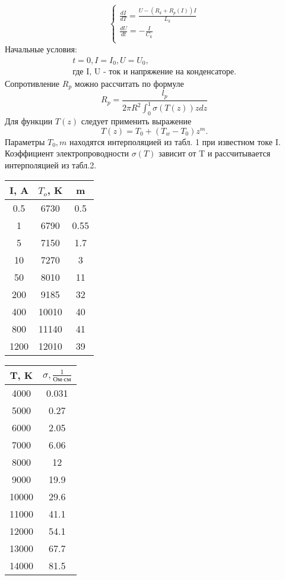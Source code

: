 \begin{equation}
\begin{cases}
\frac{dI}{dT} = \frac{U - (R_k + R_p(I))I}{L_k}\\
\frac{dU}{dt} = -\frac{I}{C_k}\\
\end{cases}
\end{equation}
Начальные условия:
\begin{eqnarray}
t = 0, I=I_0,U=U_0, \\ \nonumber\text{где I, U  - ток и напряжение на конденсаторе.}
\end{eqnarray}
Сопротивление $R_p$ можно рассчитать по формуле
\begin{equation}
R_p = \frac{l_p}{2\pi R^2 \int_0^1 \sigma (T(z))zdz}
\end{equation}
Для функции $T(z)$ следует применить выражение
\begin{equation}
T(z) = T_0+(T_w - T_0)z^m.
\end{equation}
Параметры $T_0,m$ находятся интерполяцией из табл. 1 при известном токе I.\\
Коэффициент электропроводности $\sigma(T)$ зависит от T и рассчитывается интерполяцией из табл.2.
\begin{table}[!h]
\begin{floatrow}
\ttabbox[\FBwidth]{\caption{}}
{\begin{tabular}{|c|c|c|}
	\hline
	I, A		 & $T_o$, K & m \\
	\hline
	0.5 & 6730 & 0.5 \\
	\hline
	1 & 6790 & 0.55 \\
	\hline
	5 & 7150 & 1.7 \\
	\hline
	10 & 7270 & 3 \\
	\hline
	50 & 8010 & 11 \\
	\hline
	200 & 9185 & 32 \\
	\hline
	400 & 10010 & 40 \\
	\hline
	800 & 11140 & 41 \\
	\hline
	1200 & 12010 & 39 \\
	\hline
\end{tabular}}
\ttabbox[\FBwidth]{\caption{}}
	{\begin{tabular}{|c|c|}
		\hline
		T, K & $\sigma, \frac{1}{\text{Ом} \cdot \text{см}} $ \\
		\hline
		4000 & 0.031 \\
		\hline
		5000 & 0.27 \\
		\hline
		6000 & 2.05 \\
		\hline
		7000 & 6.06 \\
		\hline
		8000 & 12 \\
		\hline
		9000 & 19.9 \\
		\hline
		10000 & 29.6 \\
		\hline
		11000 & 41.1 \\
		\hline
		12000 & 54.1 \\
		\hline
		13000 & 67.7 \\
		\hline
		14000 & 81.5 \\
		\hline
	\end{tabular}}	
\end{floatrow}
\end{table}
